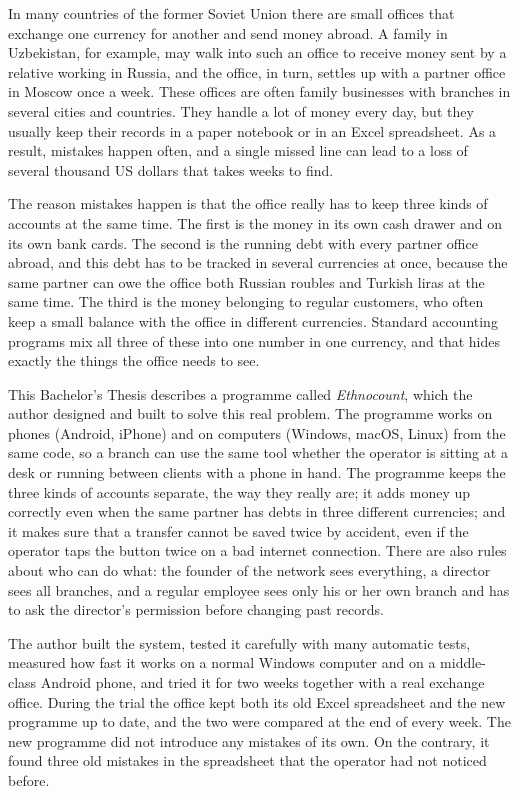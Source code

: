 \frontmatterpage
{}

In many countries of the former Soviet Union there are small offices that exchange one currency for another and send money abroad. A family in Uzbekistan, for example, may walk into such an office to receive money sent by a relative working in Russia, and the office, in turn, settles up with a partner office in Moscow once a week. These offices are often family businesses with branches in several cities and countries. They handle a lot of money every day, but they usually keep their records in a paper notebook or in an Excel spreadsheet. As a result, mistakes happen often, and a single missed line can lead to a loss of several thousand US dollars that takes weeks to find.

The reason mistakes happen is that the office really has to keep three kinds of accounts at the same time. The first is the money in its own cash drawer and on its own bank cards. The second is the running debt with every partner office abroad, and this debt has to be tracked in several currencies at once, because the same partner can owe the office both Russian roubles and Turkish liras at the same time. The third is the money belonging to regular customers, who often keep a small balance with the office in different currencies. Standard accounting programs mix all three of these into one number in one currency, and that hides exactly the things the office needs to see.

This Bachelor's Thesis describes a programme called \emph{Ethnocount}, which the author designed and built to solve this real problem. The programme works on phones (Android, iPhone) and on computers (Windows, macOS, Linux) from the same code, so a branch can use the same tool whether the operator is sitting at a desk or running between clients with a phone in hand. The programme keeps the three kinds of accounts separate, the way they really are; it adds money up correctly even when the same partner has debts in three different currencies; and it makes sure that a transfer cannot be saved twice by accident, even if the operator taps the button twice on a bad internet connection. There are also rules about who can do what: the founder of the network sees everything, a director sees all branches, and a regular employee sees only his or her own branch and has to ask the director's permission before changing past records.

The author built the system, tested it carefully with many automatic tests, measured how fast it works on a normal Windows computer and on a middle-class Android phone, and tried it for two weeks together with a real exchange office. During the trial the office kept both its old Excel spreadsheet and the new programme up to date, and the two were compared at the end of every week. The new programme did not introduce any mistakes of its own. On the contrary, it found three old mistakes in the spreadsheet that the operator had not noticed before.

